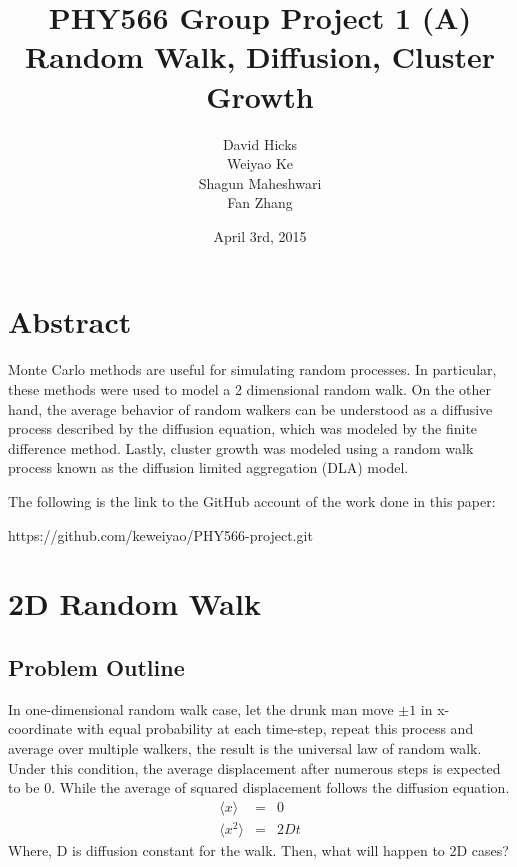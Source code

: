 \documentclass[a4paper,12pt]{article}
\begin{document}
\title{PHY566 Group Project 1 (A) \\ Random Walk, Diffusion, Cluster Growth}
\date{\small April 3rd, 2015}
\author{David Hicks\\ Weiyao Ke \\ Shagun Maheshwari \\ Fan Zhang}

\maketitle
\section{Abstract}
\indent 
\indent Monte Carlo methods are useful for simulating random processes. In particular, these methods were used to model a 2 dimensional random walk.
On the other hand, the average behavior of random walkers can be understood as a diffusive process described by the diffusion equation, which was modeled by the finite difference method.
Lastly, cluster growth was modeled using a random walk process known as the diffusion limited aggregation (DLA) model.

The following is the link to the GitHub account of the work done in this paper: \\
\begin{center}
https://github.com/keweiyao/PHY566-project.git
\end{center}

\section{2D Random Walk}
\subsection{Problem Outline}
In one-dimensional random walk case, let the drunk man move $\pm 1$ in x-coordinate with equal probability at each time-step, repeat this process and average over multiple walkers, the result is the universal law of random walk. Under this condition, the average displacement after numerous steps is expected to be $0$. While the average of squared displacement follows the diffusion equation.
\begin{eqnarray*}
\langle x \rangle &=& 0 \\
\langle x^2 \rangle &=& 2Dt
\end{eqnarray*}
Where, D is diffusion constant for the walk. Then, what will happen to 2D cases? \\
\end{document}
